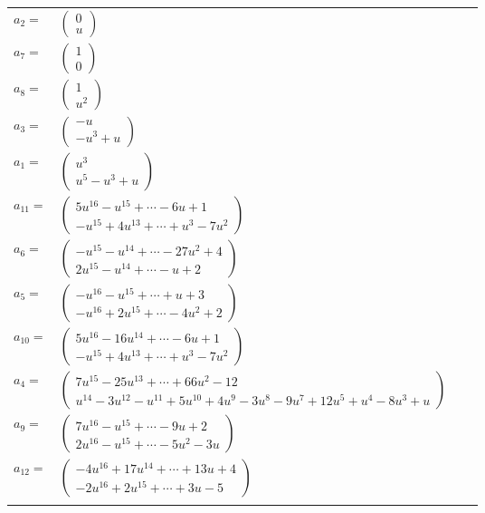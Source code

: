 \documentclass[1p]{elsarticle_modified}
\theoremstyle{definition}
\begin{document}
\begin{tabular}{m{7pt} m{180pt} m{7pt} m{180pt} }
\flushright $a_{2}=$&$\begin{pmatrix}0\\u\end{pmatrix}$ \\
\flushright $a_{7}=$&$\begin{pmatrix}1\\0\end{pmatrix}$ \\
\flushright $a_{8}=$&$\begin{pmatrix}1\\u^2\end{pmatrix}$ \\
\flushright $a_{3}=$&$\begin{pmatrix}- u\\- u^3+u\end{pmatrix}$ \\
\flushright $a_{1}=$&$\begin{pmatrix}u^3\\u^5- u^3+u\end{pmatrix}$ \\
\flushright $a_{11}=$&$\begin{pmatrix}5 u^{16}- u^{15}+\cdots-6 u+1\\- u^{15}+4 u^{13}+\cdots+u^3-7 u^2\end{pmatrix}$ \\
\flushright $a_{6}=$&$\begin{pmatrix}- u^{15}- u^{14}+\cdots-27 u^2+4\\2 u^{15}- u^{14}+\cdots- u+2\end{pmatrix}$ \\
\flushright $a_{5}=$&$\begin{pmatrix}- u^{16}- u^{15}+\cdots+u+3\\- u^{16}+2 u^{15}+\cdots-4 u^2+2\end{pmatrix}$ \\
\flushright $a_{10}=$&$\begin{pmatrix}5 u^{16}-16 u^{14}+\cdots-6 u+1\\- u^{15}+4 u^{13}+\cdots+u^3-7 u^2\end{pmatrix}$ \\
\flushright $a_{4}=$&$\begin{pmatrix}7 u^{15}-25 u^{13}+\cdots+66 u^2-12\\u^{14}-3 u^{12}- u^{11}+5 u^{10}+4 u^9-3 u^8-9 u^7+12 u^5+u^4-8 u^3+u\end{pmatrix}$ \\
\flushright $a_{9}=$&$\begin{pmatrix}7 u^{16}- u^{15}+\cdots-9 u+2\\2 u^{16}- u^{15}+\cdots-5 u^2-3 u\end{pmatrix}$ \\
\flushright $a_{12}=$&$\begin{pmatrix}-4 u^{16}+17 u^{14}+\cdots+13 u+4\\-2 u^{16}+2 u^{15}+\cdots+3 u-5\end{pmatrix}$\\&\end{tabular}
\end{document}
